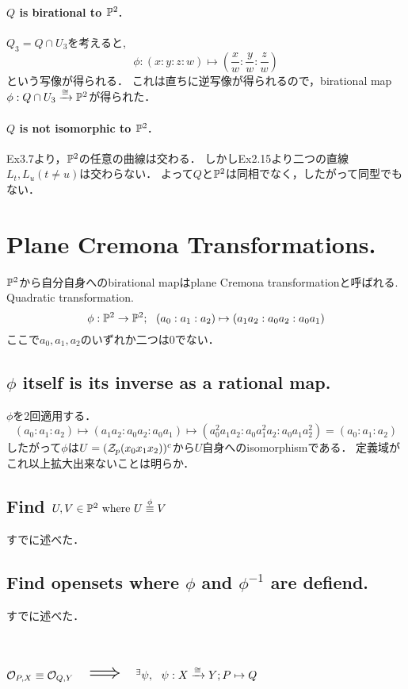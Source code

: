 \documentclass[a4paper]{jsarticle}
\begin{document}
    \paragraph{$Q$ is birational to $\mathbb{P}^2$.}
    $Q_3=Q \cap U_3$を考えると,
    \[ \phi:(x:y:z:w) \mapsto \left( \frac{x}{w}:\frac{y}{w}:\frac{z}{w} \right) \]
    という写像が得られる．
    これは直ちに逆写像が得られるので，birational map $\phi: Q \cap U_3 \xrightarrow{\cong} \mathbb{P}^2$が得られた．

    \paragraph{$Q$ is not isomorphic to $\mathbb{P}^2$.}
    Ex3.7より，$\mathbb{P}^2$の任意の曲線は交わる．
    しかしEx2.15より二つの直線$L_t, L_u (t \neq u)$は交わらない．
    よって$Q$と$\mathbb{P}^2$は同相でなく，したがって同型でもない．

\section{Plane Cremona Transformations.} %
    $\mathbb{P}^2$から自分自身へのbirational mapはplane Cremona transformationと呼ばれる.
    Quadratic transformation.
    \[ \phi: \mathbb{P}^2 \to \mathbb{P}^2;~~ (a_0:a_1:a_2) \mapsto (a_1 a_2:a_0 a_2:a_0 a_1) \]
    ここで$a_0,a_1,a_2$のいずれか二つは0でない．

    \subsection{$\phi$ itself is its inverse as a rational map.}
    $\phi$を2回適用する．
    \[ (a_0:a_1:a_2) \mapsto (a_1 a_2:a_0 a_2:a_0 a_1) \mapsto (a_0^2 a_1 a_2:a_0 a_1^2 a_2:a_0 a_1 a_2^2)=(a_0:a_1:a_2) \]
    したがって$\phi$は$U=(\mathcal{Z}_p(x_0 x_1 x_2))^c$から$U$自身へのisomorphismである．
    定義域がこれ以上拡大出来ないことは明らか．

    \subsection{Find $U,V \in \mathbb{P}^2 \text{ where } U \overset{\phi}{\equiv} V$}
    すでに述べた．

    \subsection{Find opensets where $\phi$ and $\phi^{-1}$ are defiend.}
    すでに述べた．

\section{$\mathcal{O}_{P,X} \equiv \mathcal{O}_{Q,Y}$ $\implies$ ${}^{\exists} \psi,~~ \psi:X \xrightarrow{\cong} Y; P \mapsto Q$} %
\end{document}
